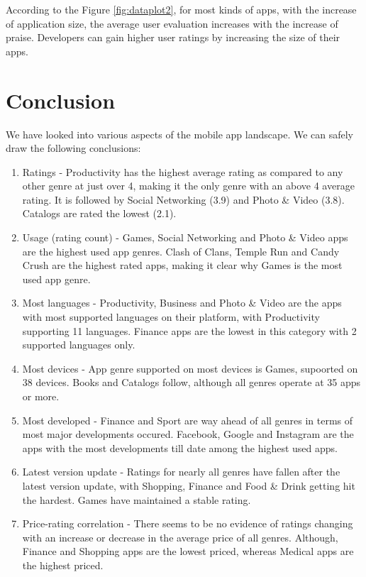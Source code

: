 \documentclass[
]{article}
\begin{document}
According to the Figure \ref{fig:dataplot2}, for most kinds of apps, with the increase of application size, the average user evaluation increases with the increase of praise. Developers can gain higher user ratings by increasing the size of their apps.

\hypertarget{conclusion}{%
\section{Conclusion}\label{conclusion}}

We have looked into various aspects of the mobile app landscape. We can safely draw the following conclusions:

\begin{enumerate}
\def\labelenumi{\arabic{enumi}.}
\item
  Ratings - Productivity has the highest average rating as compared to any other genre at just over 4, making it the only genre with an above 4 average rating. It is followed by Social Networking (3.9) and Photo \& Video (3.8). Catalogs are rated the lowest (2.1).
\item
  Usage (rating count) - Games, Social Networking and Photo \& Video apps are the highest used app genres. Clash of Clans, Temple Run and Candy Crush are the highest rated apps, making it clear why Games is the most used app genre.
\item
  Most languages - Productivity, Business and Photo \& Video are the apps with most supported languages on their platform, with Productivity supporting 11 languages. Finance apps are the lowest in this category with 2 supported languages only.
\item
  Most devices - App genre supported on most devices is Games, supoorted on 38 devices. Books and Catalogs follow, although all genres operate at 35 apps or more.
\item
  Most developed - Finance and Sport are way ahead of all genres in terms of most major developments occured. Facebook, Google and Instagram are the apps with the most developments till date among the highest used apps.
\item
  Latest version update - Ratings for nearly all genres have fallen after the latest version update, with Shopping, Finance and Food \& Drink getting hit the hardest. Games have maintained a stable rating.
\item
  Price-rating correlation - There seems to be no evidence of ratings changing with an increase or decrease in the average price of all genres. Although, Finance and Shopping apps are the lowest priced, whereas Medical apps are the highest priced.
\end{enumerate}
\end{document}

